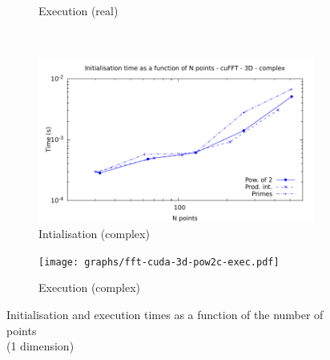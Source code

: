 \documentclass[12pt, a4paper]{article}
\begin{document}
\begin{figure}[H]
\begin{subfigure}{.5\textwidth}
\caption{Execution (real)}
\label{FFTCUDA1DRE}
\end{subfigure}\\
\begin{subfigure}{.5\textwidth}
\centering
\includegraphics[width=.9\linewidth]{graphs/fft-cuda-3d-pow2-c-init.pdf}
\caption{Intialisation (complex)}
\label{FFTCUDA1DCI}
\end{subfigure}%
\begin{subfigure}{.5\textwidth}
\centering
\texttt{[image: graphs/fft-cuda-3d-pow2c-exec.pdf]}
\caption{Execution (complex)}
\label{FFTCUDA1DCE}
\end{subfigure}
\caption{Initialisation and execution times as a function of the number of points\\(1 dimension)}
\label{FFTCUDA1D}
\end{figure}
\end{document}
